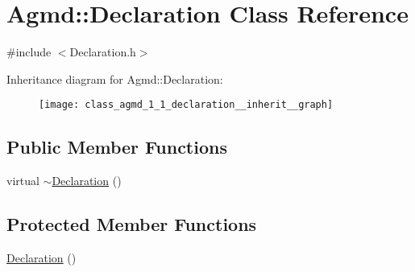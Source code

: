 \hypertarget{class_agmd_1_1_declaration}{\section{Agmd\+:\+:Declaration Class Reference}
\label{class_agmd_1_1_declaration}
}


{\ttfamily \#include $<$Declaration.\+h$>$}



Inheritance diagram for Agmd\+:\+:Declaration\+:\nopagebreak
\begin{figure}[H]
\begin{center}
\leavevmode
\texttt{[image: class\_agmd\_1\_1\_declaration\_\_inherit\_\_graph]}
\end{center}
\end{figure}
\subsection*{Public Member Functions}
\begin{DoxyCompactItemize}
\item 
virtual \hyperlink{class_agmd_1_1_declaration_a69f91dfc583236cc26d20858ec9120d2}{$\sim$\+Declaration} ()
\end{DoxyCompactItemize}
\subsection*{Protected Member Functions}
\begin{DoxyCompactItemize}
\item 
\hyperlink{class_agmd_1_1_declaration_a7f757ec263b3e2fbfdc9bc56a8069601}{Declaration} ()
\end{DoxyCompactItemize}


